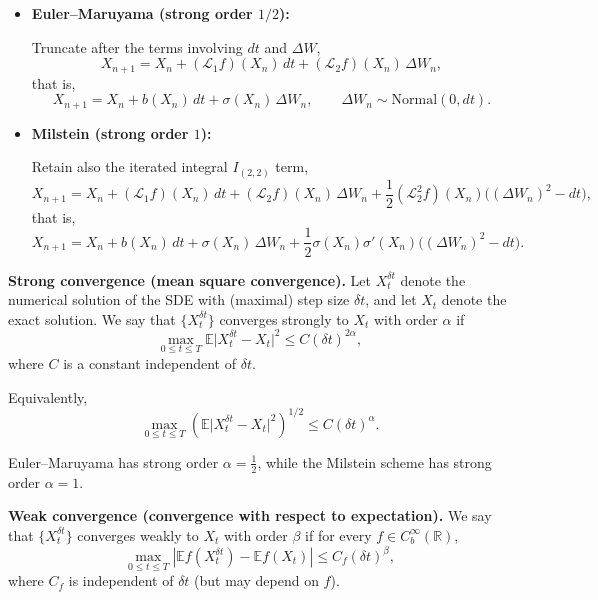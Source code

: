 \documentclass[11pt]{article}
\begin{document}
\begin{itemize}

\item \textbf{Euler--Maruyama (strong order $1/2$):}

Truncate after the terms involving $dt$ and $\Delta W$,
\begin{equation}
X_{n+1}
=
X_n
+
(\mathcal L_1 f)(X_n)\,dt
+
(\mathcal L_2 f)(X_n)\,\Delta W_n,
\end{equation}
that is,
\begin{equation}
X_{n+1}
=
X_n
+
b(X_n)\,dt
+
\sigma(X_n)\,\Delta W_n,
\qquad
\Delta W_n \sim \mathrm{Normal}(0,dt).
\end{equation}

\item \textbf{Milstein (strong order $1$):}

Retain also the iterated integral $I_{(2,2)}$ term,
\begin{equation}
X_{n+1}
=
X_n
+
(\mathcal L_1 f)(X_n)\,dt
+
(\mathcal L_2 f)(X_n)\,\Delta W_n
+
\frac12 (\mathcal L_2^2 f)(X_n)\big((\Delta W_n)^2 - dt\big),
\end{equation}
that is,
\begin{equation}
X_{n+1}
=
X_n
+
b(X_n)\,dt
+
\sigma(X_n)\,\Delta W_n
+
\frac12 \sigma(X_n)\sigma'(X_n)
\big((\Delta W_n)^2 - dt\big).
\end{equation}

\end{itemize}
\noindent
\textbf{Strong convergence (mean square convergence).}
Let $X_t^{\delta t}$ denote the numerical solution of the SDE with (maximal) step size $\delta t$, and let $X_t$ denote the exact solution.  
We say that $\{X_t^{\delta t}\}$ converges strongly to $X_t$ with order $\alpha$ if
\begin{equation}
\max_{0 \le t \le T}
\mathbb E \big| X_t^{\delta t} - X_t \big|^2
\le
C (\delta t)^{2\alpha},
\end{equation}
where $C$ is a constant independent of $\delta t$.

Equivalently,
\begin{equation}
\max_{0 \le t \le T}
\left(
\mathbb E \big| X_t^{\delta t} - X_t \big|^2
\right)^{1/2}
\le
C (\delta t)^{\alpha}.
\end{equation}

Euler--Maruyama has strong order $\alpha = \tfrac12$, while the Milstein scheme has strong order $\alpha = 1$.

\medskip

\noindent
\textbf{Weak convergence (convergence with respect to expectation).}
We say that $\{X_t^{\delta t}\}$ converges weakly to $X_t$ with order $\beta$ if for every $f \in C_b^\infty(\mathbb R)$,
\begin{equation}
\max_{0 \le t \le T}
\left|
\mathbb E f(X_t^{\delta t})
-
\mathbb E f(X_t)
\right|
\le
C_f (\delta t)^{\beta},
\end{equation}
where $C_f$ is independent of $\delta t$ (but may depend on $f$).
\end{document}
